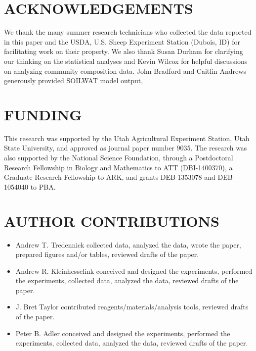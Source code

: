 \documentclass[fleqn,10pt,lineno]{wlpeerj} %
\begin{document}
\section{ACKNOWLEDGEMENTS}\label{acknowledgements}

We thank the many summer research technicians who collected the data
reported in this paper and the USDA, U.S. Sheep Experiment Station
(Dubois, ID) for facilitating work on their property. We also thank
Susan Durham for clarifying our thinking on the statistical analyses and
Kevin Wilcox for helpful discussions on analyzing community composition
data. John Bradford and Caitlin Andrews generously provided SOILWAT
model output,

\section{FUNDING}\label{funding}

This research was supported by the Utah Agricultural Experiment Station,
Utah State University, and approved as journal paper number 9035. The
research was also supported by the National Science Foundation, through
a Postdoctoral Research Fellowship in Biology and Mathematics to ATT
(DBI-1400370), a Graduate Research Fellowship to ARK, and grants
DEB-1353078 and DEB-1054040 to PBA.

\section{AUTHOR CONTRIBUTIONS}\label{author-contributions}

\begin{itemize}
  \item Andrew T. Tredennick collected data, analyzed the data, wrote the paper, prepared figures and/or tables, reviewed drafts of the paper.
  \item Andrew R. Kleinhesselink conceived and designed the experiments, performed the experiments, collected data, analyzed the data, reviewed drafts of the paper.
  \item J. Bret Taylor contributed reagents/materials/analysis tools, reviewed drafts of the paper.
  \item Peter B. Adler conceived and designed the experiments, performed the experiments, collected data, analyzed the data, reviewed drafts of the paper.
\end{itemize}
\end{document}
